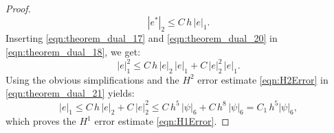 \begin{proof}
  \begin{equation}
    |e^* |_2 \leq C \, h \, | e |_1 .
    \label{eqn:theorem_dual_20}
  \end{equation}
  Inserting \eqref{eqn:theorem_dual_17} and \eqref{eqn:theorem_dual_20}  in
  \eqref{eqn:theorem_dual_18}, we get:
  \begin{equation}
    |e|_1^2 \leq C \, h \, | e |_2 \, | e |_1 + C \, | e |_2^2 \, | e |_1 .
    \label{eqn:theorem_dual_21}
  \end{equation}
  Using the obvious simplifications and the $H^2$ error estimate
  \eqref{eqn:H2Error} in \eqref{eqn:theorem_dual_21} yields:
  \begin{equation}
    |e|_1 \leq C \, h \, | e |_2 + C \, | e |_2^2 \leq C \, h^5\, |\psi|_6 + C
      \, h^8\, |\psi|_6 = C_1 \, h^5 |\psi|_6,
    \label{eqn:theorem_dual_22}
  \end{equation}
  which proves the $H^1$ error estimate \eqref{eqn:H1Error}.
\end{proof}
